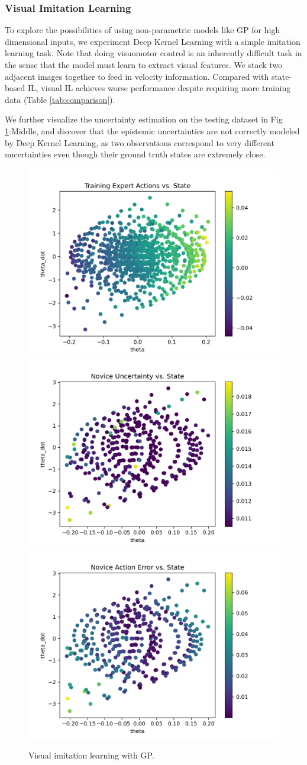 \documentclass[11pt, reqno, letterpaper, twoside]{amsart}
\begin{document}
\subsubsection{Visual Imitation Learning} \label{vis-il}
To explore the possibilities of using non-parametric models like GP for high dimensional inputs, we experiment Deep Kernel Learning with a simple imitation learning task. Note that doing visuomotor control is an inherently difficult task in the sense that the model must learn to extract visual features.
We stack two adjacent images together to feed in velocity information.
Compared with state-based IL, visual IL  achieves worse performance despite requiring more training data (Table \ref{tab:comparison}).

We further visualize the uncertainty estimation on the testing dataset in Fig \ref{fig:visual-il}:Middle, and discover that the epistemic uncertainties are not correctly modeled by Deep Kernel Learning, as two observations correspond to very different uncertainties even though their ground truth states are extremely close.

\begin{figure}[ht]
	\centering
	\includegraphics[width=0.32\linewidth]{imgs/expert_data_0.png}
	\includegraphics[width=0.32\linewidth]{imgs/novice_uncertainty_0.png}
	\includegraphics[width=0.32\linewidth]{imgs/novice_error_0.png}
	\caption{Visual imitation learning with GP.}
	\label{fig:visual-il}
\end{figure}
\end{document}
